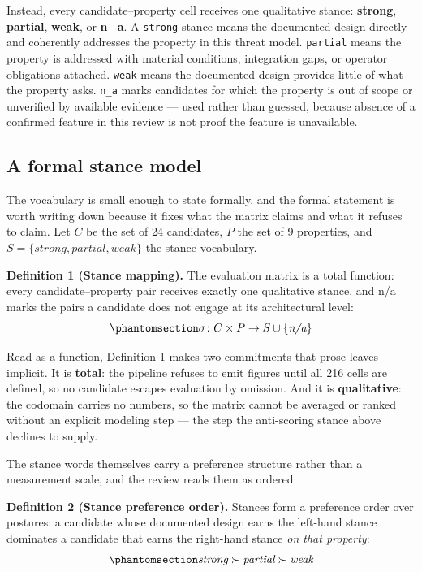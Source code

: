 \documentclass[
  english,
  9pt,
]{extarticle}
\begin{document}
Instead, every candidate--property cell receives one qualitative stance:
\textbf{strong}, \textbf{partial}, \textbf{weak}, or \textbf{n\_a}. A
\texttt{strong} stance means the documented design directly and
coherently addresses the property in this threat model. \texttt{partial}
means the property is addressed with material conditions, integration
gaps, or operator obligations attached. \texttt{weak} means the
documented design provides little of what the property asks.
\texttt{n\_a} marks candidates for which the property is out of scope or
unverified by available evidence --- used rather than guessed, because
absence of a confirmed feature in this review is not proof the feature
is unavailable.

\subsection{A formal stance model}\label{a-formal-stance-model}

The vocabulary is small enough to state formally, and the formal
statement is worth writing down because it fixes what the matrix claims
and what it refuses to claim. Let \(C\) be the set of 24 candidates,
\(P\) the set of 9 properties, and
\(S = \{\textit{strong}, \textit{partial}, \textit{weak}\}\) the stance
vocabulary.

\protect{}\label{def:stance_mapping}
\textbf{Definition 1 (Stance mapping).} The evaluation matrix is a total
function: every candidate--property pair receives exactly one
qualitative stance, and n/a marks the pairs a candidate does not engage
at its architectural level:
\begin{equation}\protect\phantomsection\label{eq:stance_mapping}{\sigma\colon C \times P \to S \cup \{\textit{n/a}\}}\end{equation}

Read as a function, \hyperref[def:stance_mapping]{Definition 1} makes
two commitments that prose leaves implicit. It is \textbf{total}: the
pipeline refuses to emit figures until all 216 cells are defined, so no
candidate escapes evaluation by omission. And it is
\textbf{qualitative}: the codomain carries no numbers, so the matrix
cannot be averaged or ranked without an explicit modeling step --- the
step the anti-scoring stance above declines to supply.

The stance words themselves carry a preference structure rather than a
measurement scale, and the review reads them as ordered:

\protect{}\label{def:stance_order}
\textbf{Definition 2 (Stance preference order).} Stances form a
preference order over postures: a candidate whose documented design
earns the left-hand stance dominates a candidate that earns the
right-hand stance \emph{on that property}:
\begin{equation}\protect\phantomsection\label{eq:stance_order}{\textit{strong} \succ \textit{partial} \succ \textit{weak}}\end{equation}
\end{document}
